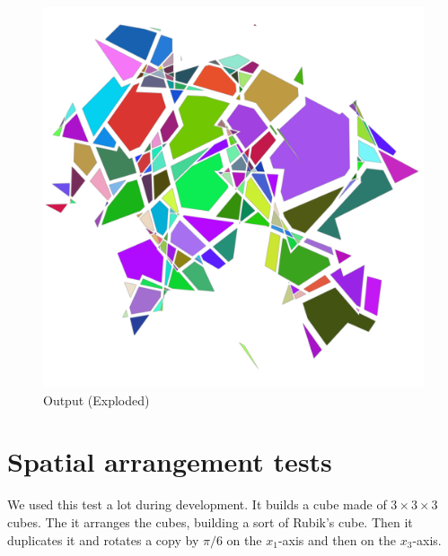 \begin{figure}[p!]
    \includegraphics[width=\textwidth]{./img/test-lines-out.pdf}%
    \caption{Output (Exploded)}
\end{figure}

\section{Spatial arrangement tests}
\label{ch:spatial_arrangement_tests}

We used this test a lot during development. It builds
a cube made of $3 \times 3 \times 3$ cubes. The it arranges
the cubes, building a sort of Rubik's cube. Then it duplicates
it and rotates a copy by $\pi / 6$ on the $x_1$-axis
and then on the $x_3$-axis.

